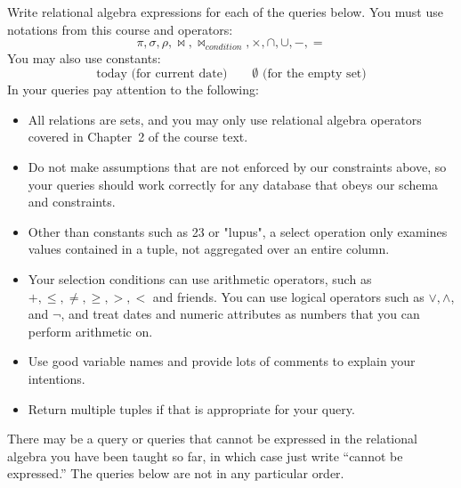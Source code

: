 \documentclass[boldsans]{article}
\begin{document}
Write relational algebra expressions for each of the queries below.
You must use notations from this course and operators:
\begin{equation*}
  \pi, \sigma, \rho, \bowtie, \bowtie_{condition}, \times, \cap, \cup,
  -, =
\end{equation*}
You may also use constants:
\begin{equation*}
  \text{today (for current date)}\qquad\emptyset\text{ (for the empty set)}
\end{equation*}
In your queries pay attention to the following:
\begin{itemize}
\item All relations are sets, and you may only use relational algebra
  operators covered in Chapter~2 of the course text.

\item Do not make assumptions that are not enforced by our constraints
  above, so your queries should work correctly for any database that
  obeys our schema and constraints.

\item Other than constants such as 23 or "lupus", a select operation
  only examines values contained in a tuple, not aggregated over an
  entire column.

\item Your selection conditions can use arithmetic operators, such as
  $+, \leq, \neq, \geq, >, <$ and friends.  You can use logical
  operators such as $\vee, \wedge$, and $\neg$, and treat dates and
  numeric attributes as numbers that you can perform arithmetic on.

\item Use good variable names and provide lots of comments to explain
  your intentions.

\item Return multiple tuples if that is appropriate for your query.
\end{itemize}

There may be a query or queries that cannot be expressed in the
relational algebra you have been taught so far, in which case just
write ``cannot be expressed.''  The queries below are not in any
particular order.
\end{document}
